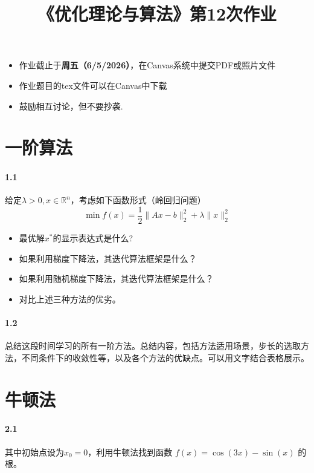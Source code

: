\documentclass[12pt,a4paper]{article}
\begin{document}
\title{
{《优化理论与算法》第12次作业
}
}
\date{}


\maketitle
\begin{itemize}
	\item 作业截止于{\bf 周五（6/5/2026）}，在Canvas系统中提交PDF或照片文件
	\item 作业题目的tex文件可以在Canvas中下载
	\item 鼓励相互讨论，但不要抄袭.
\end{itemize}



\section{一阶算法}

\paragraph{1.1}  给定$\lambda>0, x\in \mathbb{R}^n$，考虑如下函数形式（岭回归问题）
$$\min f(x)=\frac{1}{2} \|Ax-b\|^2_2+\lambda \|x\|_2^2$$
\begin{itemize}
	\item 最优解$x^*$的显示表达式是什么?
	\item 如果利用梯度下降法，其迭代算法框架是什么？
	\item 如果利用随机梯度下降法，其迭代算法框架是什么？
	\item 对比上述三种方法的优劣。
\end{itemize}


\paragraph{1.2} 总结这段时间学习的所有一阶方法。总结内容，包括方法适用场景，步长的选取方法，不同条件下的收敛性等，以及各个方法的优缺点。可以用文字结合表格展示。


\section{牛顿法}

\paragraph{2.1}
其中初始点设为$x_0=0$，利用牛顿法找到函数 $f(x)=\cos(3x)-\sin(x)$ 的根。
\end{document}
